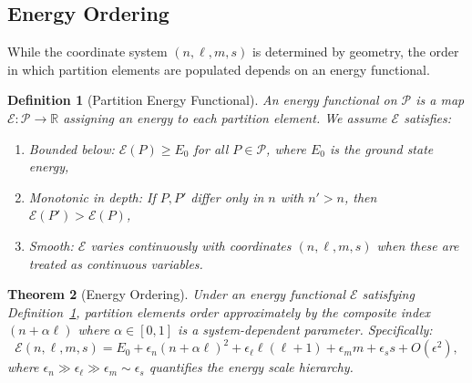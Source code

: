 \documentclass[twocolumn,10pt,a4paper]{article}
\newtheorem{theorem}{Theorem}[section]
\newtheorem{definition}[theorem]{Definition}
\theoremstyle{remark}
\newcommand{\partition}{\mathcal{P}}
\newcommand{\Reals}{\mathbb{R}}
\begin{document}
\subsection{Energy Ordering}

While the coordinate system $(n, \ell, m, s)$ is determined by geometry, the order in which partition elements are populated depends on an energy functional.

\begin{definition}[Partition Energy Functional]
\label{def:energy_functional}
An \emph{energy functional} on $\partition$ is a map $\mathcal{E}: \partition \to \Reals$ assigning an energy to each partition element. We assume $\mathcal{E}$ satisfies:
\begin{enumerate}[label=(\roman*), noitemsep]
    \item \emph{Bounded below}: $\mathcal{E}(P) \geq E_0$ for all $P \in \partition$, where $E_0$ is the ground state energy,
    \item \emph{Monotonic in depth}: If $P, P'$ differ only in $n$ with $n' > n$, then $\mathcal{E}(P') > \mathcal{E}(P)$,
    \item \emph{Smooth}: $\mathcal{E}$ varies continuously with coordinates $(n, \ell, m, s)$ when these are treated as continuous variables.
\end{enumerate}
\end{definition}

\begin{theorem}[Energy Ordering]
\label{thm:energy_ordering}
Under an energy functional $\mathcal{E}$ satisfying Definition~\ref{def:energy_functional}, partition elements order approximately by the composite index $(n + \alpha \ell)$ where $\alpha \in [0, 1]$ is a system-dependent parameter. Specifically:
\begin{equation}
\mathcal{E}(n, \ell, m, s) = E_0 + \epsilon_n (n + \alpha \ell)^2 + \epsilon_\ell \ell(\ell + 1) + \epsilon_m m + \epsilon_s s + O(\epsilon^2),
\end{equation}
where $\epsilon_n \gg \epsilon_\ell \gg \epsilon_m \sim \epsilon_s$ quantifies the energy scale hierarchy.
\end{theorem}
\end{document}
